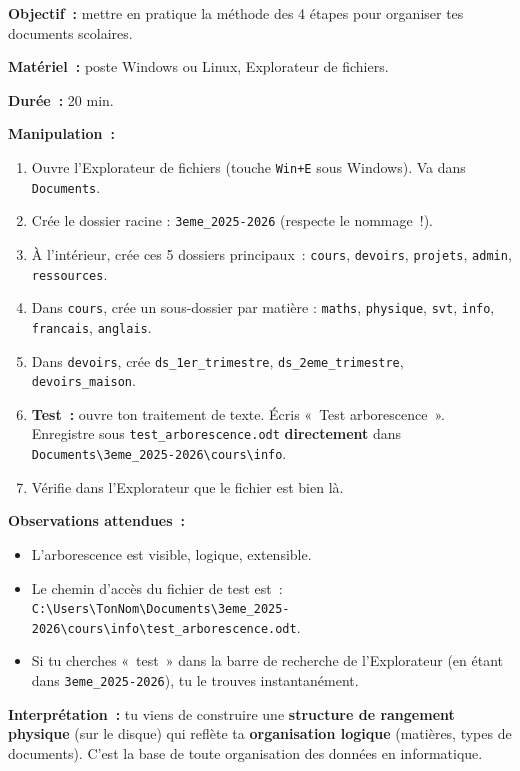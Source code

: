 \documentclass[11pt]{article}
\begin{document}
\begin{experience}
\textbf{Objectif~:} mettre en pratique la méthode des 4 étapes pour organiser tes documents scolaires.

\textbf{Matériel~:} poste Windows ou Linux, Explorateur de fichiers.

\textbf{Durée~:} 20 min.

\textbf{Manipulation~:}
\begin{enumerate}
    \item Ouvre l'Explorateur de fichiers (touche \texttt{Win+E} sous Windows). Va dans \texttt{Documents}.
    \item Crée le dossier racine : \texttt{3eme\_2025-2026} (respecte le nommage~!).
    \item À l'intérieur, crée ces 5 dossiers principaux~: \texttt{cours}, \texttt{devoirs}, \texttt{projets}, \texttt{admin}, \texttt{ressources}.
    \item Dans \texttt{cours}, crée un sous-dossier par matière : \texttt{maths}, \texttt{physique}, \texttt{svt}, \texttt{info}, \texttt{francais}, \texttt{anglais}.
    \item Dans \texttt{devoirs}, crée \texttt{ds\_1er\_trimestre}, \texttt{ds\_2eme\_trimestre}, \texttt{devoirs\_maison}.
    \item \textbf{Test~:} ouvre ton traitement de texte. Écris «~Test arborescence~». Enregistre sous \texttt{test\_arborescence.odt} \textbf{directement} dans \texttt{Documents\textbackslash{}3eme\_2025-2026\textbackslash{}cours\textbackslash{}info}.
    \item Vérifie dans l'Explorateur que le fichier est bien là.
\end{enumerate}

\textbf{Observations attendues~:}
\begin{itemize}
    \item L'arborescence est visible, logique, extensible.
    \item Le chemin d'accès du fichier de test est~: \texttt{C:\textbackslash{}Users\textbackslash{}TonNom\textbackslash{}Documents\textbackslash{}3eme\_2025-2026\textbackslash{}cours\textbackslash{}info\textbackslash{}test\_arborescence.odt}.
    \item Si tu cherches «~test~» dans la barre de recherche de l'Explorateur (en étant dans \texttt{3eme\_2025-2026}), tu le trouves instantanément.
\end{itemize}

\textbf{Interprétation~:} tu viens de construire une \textbf{structure de rangement physique} (sur le disque) qui reflète ta \textbf{organisation logique} (matières, types de documents). C'est la base de toute organisation des données en informatique.
\end{experience}
\end{document}
